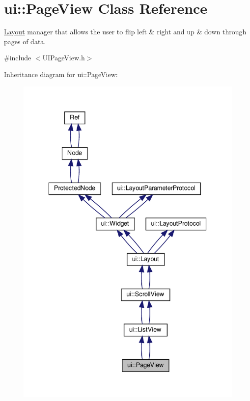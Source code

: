 \hypertarget{classui_1_1PageView}{}\section{ui\+:\+:Page\+View Class Reference}
\label{classui_1_1PageView}


\hyperlink{classui_1_1Layout}{Layout} manager that allows the user to flip left \& right and up \& down through pages of data.  




{\ttfamily \#include $<$U\+I\+Page\+View.\+h$>$}



Inheritance diagram for ui\+:\+:Page\+View\+:
\nopagebreak
\begin{figure}[H]
\begin{center}
\leavevmode
\includegraphics[width=329pt]{classui_1_1PageView__inherit__graph}
\end{center}
\end{figure}


